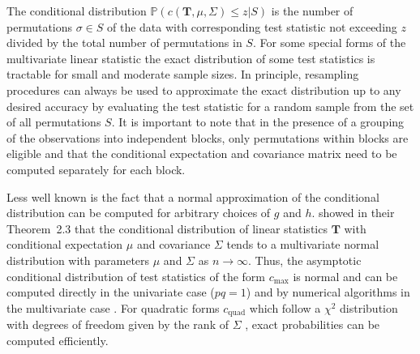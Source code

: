 \documentclass{article}
\newcommand{\Rpackage}[1]{{\normalfont\fontseries{b}\selectfont #1}}
\newcommand{\Prob}{\mathbb{P} }
\newcommand{\T}{\mathbf{T}}
\begin{document}

The conditional distribution $\Prob(c(\T, \mu, \Sigma) \le z | S)$
is the number of permutations $\sigma \in S$ of the data 
with corresponding test statistic not exceeding $z$ divided by the total number
of permutations in $S$. For some special forms of the
multivariate linear statistic the exact distribution of some 
test statistics is tractable for small and moderate sample sizes.
In principle, resampling procedures can always be used to 
approximate the exact distribution up to any desired accuracy by evaluating
the test statistic for a random sample from the set of all permutations $S$.
It is important to note that in the presence of a grouping of the observations
into independent blocks, 
only permutations within blocks are eligible and that the
conditional expectation and covariance matrix need to be computed
separately for each block.

Less well known is the fact that 
a normal approximation of the conditional distribution can be computed 
for arbitrary choices of $g$ and $h$. 
\cite{StrasserWeber1999} showed in their Theorem~2.3 that the   
conditional distribution of linear statistics $\T$ with conditional    
expectation $\mu$ and covariance $\Sigma$ tends to a multivariate normal
distribution with parameters $\mu$ and $\Sigma$ as $n \rightarrow
\infty$. Thus, the asymptotic conditional distribution of test statistics of
the form $c_\text{max}$ is normal and
can be computed directly in the univariate case ($pq = 1$) and by numerical 
algorithms in the multivariate case \citep{numerical-:1992}.
For quadratic forms
$c_\text{quad}$ which follow a $\chi^2$ distribution with degrees of freedom
given by the rank of $\Sigma$ \citep[see][Chapter 29]{johnsonkotz1970}, exact
probabilities can be computed efficiently.
\end{document}
